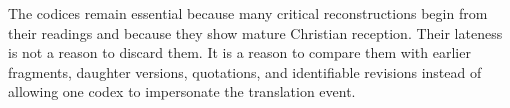 The codices remain essential because many critical reconstructions begin from their readings and because they show mature Christian reception. Their lateness is not a reason to discard them. It is a reason to compare them with earlier fragments, daughter versions, quotations, and identifiable revisions instead of allowing one codex to impersonate the translation event.

